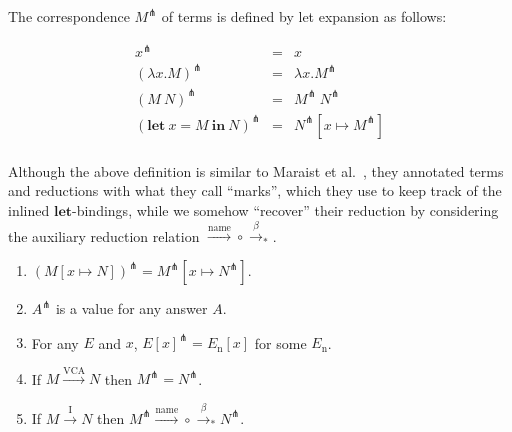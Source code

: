 \documentclass[english]{sumiilab-paper}
\newcommand{\LET}[3]{\mathbf{let}~#1=#2~\mathbf{in}~#3}
\newcommand{\EXPANDLET}[1]{#1^\pitchfork}
\newcommand{\FULLBETA}{\xrightarrow{\beta}}
\newcommand{\CALLBYNAME}{\xrightarrow{\mathrm{name}}}
\newcommand{\CALLBYNEEDI}{\xrightarrow{\mathrm{I}}}
\newcommand{\CALLBYNEEDVCA}{\xrightarrow{\mathrm{VCA}}}
\newcommand{\RTCLOS}[1]{#1_*}
\begin{document}
The correspondence $\EXPANDLET{M}$ of terms is defined by let expansion as follows:
\begin{definition}\label{def:expandlet}
	\[ \begin{array}{rcl}
		\EXPANDLET{x} & = & x \\
		\EXPANDLET{(\lambda x. M)} & = & \lambda x. \EXPANDLET{M} \\
		\EXPANDLET{(M~N)} & = & \EXPANDLET{M}~\EXPANDLET{N} \\
		\EXPANDLET{(\LET{x}{M}{N})} & = & \EXPANDLET{N}[x \mapsto \EXPANDLET{M}] \\
	\end{array} \]
\end{definition}
%
Although the above definition is similar to Maraist et al.~\cite{Maraist98}, they annotated terms and reductions with what they call ``marks'', which they use to keep track of the inlined $\mathbf{let}$-bindings, while we somehow ``recover'' their reduction by considering the auxiliary reduction relation ${\CALLBYNAME}\circ{\RTCLOS{\FULLBETA}}$.
%
\begin{lemma}\label{lemma:single-step-soundness} \qquad
	\begin{enumerate}
		\item $\EXPANDLET{(M[x \mapsto N])} = \EXPANDLET{M}[x \mapsto \EXPANDLET{N}]$.
		\item $\EXPANDLET{A}$ is a value for any answer $A$. \label{enum:value-answer}
		\item For any $E$ and $x$, $\EXPANDLET{E[x]} = E_\mathrm{n}[x]$ for some $E_\mathrm{n}$. \label{enum:stuck}
		\item If $M \CALLBYNEEDVCA N$ then $\EXPANDLET{M} = \EXPANDLET{N}$. \label{enum:administrative}
		\item If $M \CALLBYNEEDI N$ then $\EXPANDLET{M} {\CALLBYNAME}\circ{\RTCLOS{\FULLBETA}} \EXPANDLET{N}$. \label{enum:actual}
	\end{enumerate}
\end{lemma}
%
\end{document}
